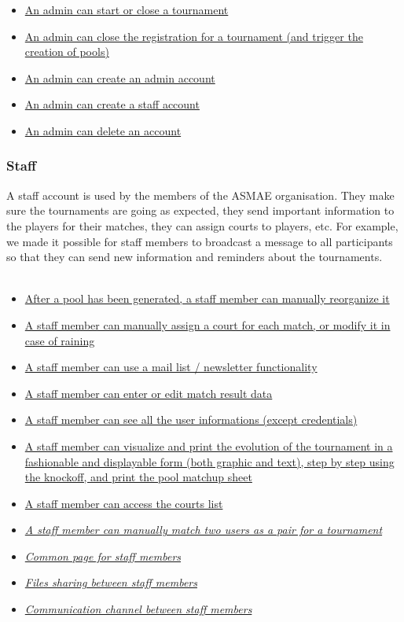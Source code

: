 \documentclass[a4paper, 12pt]{article}
\begin{document}
    \begin{itemize}
    	\item \underline{An admin can start or close a tournament}
    	\item \underline{An admin can close the registration for a tournament (and trigger the creation of pools)}
    	\item \underline{An admin can create an admin account}
		\item \underline{An admin can create a staff account}
		\item \underline{An admin can delete an account}

    \end{itemize}
    
\subsubsection*{Staff} 
    A staff account is used by the members of the ASMAE organisation. They make sure the tournaments are going as expected, they send important information to the players for their matches, they can assign courts to players, etc. For example, we made it possible for staff members to  broadcast a message to all participants so that they can send new information and reminders about the tournaments.\\\\
    
    \begin{itemize}
    	\item \underline{After a pool has been generated, a staff member can manually reorganize it}
		\item \underline{A staff member can manually assign a court for each match, or modify it in case of raining}
		\item \underline{A staff member can use a mail list / newsletter functionality}
		\item \underline{A staff member can enter or edit match result data}
		\item \underline{A staff member can see all the user informations (except credentials)}
		\item \underline{A staff member can visualize and print the evolution of the tournament in a fashionable and displayable form (both graphic and text), step by step using the knockoff, and print the pool matchup sheet}
		\item \underline{A staff member can access the courts list}
		\item \underline{\textit{A staff member can manually match two users as a pair for a tournament}}
		\item \underline{\textit{Common page for staff members}}
		\item \underline{\textit{Files sharing between staff members}}
		\item \underline{\textit{Communication channel between staff members}}
    \end{itemize}
    
\end{document}
